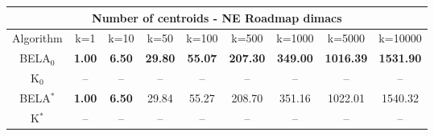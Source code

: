 \begin{tabular}{c|cccccccc}\toprule
\multicolumn{9}{c}{Number of centroids - NE Roadmap dimacs}\\ \midrule
Algorithm & k=1 & k=10 & k=50 & k=100 & k=500 & k=1000 & k=5000 & k=10000 \\ \midrule
BELA$_0$ & \textbf{1.00} & \textbf{6.50} & \textbf{29.80} & \textbf{55.07} & \textbf{207.30} & \textbf{349.00} & \textbf{1016.39} & \textbf{1531.90} \\
K$_0$ & -- & -- & -- & -- & -- & -- & -- & -- \\
BELA$^*$ & \textbf{1.00} & \textbf{6.50} & 29.84 & 55.27 & 208.70 & 351.16 & 1022.01 & 1540.32 \\
K$^*$ & -- & -- & -- & -- & -- & -- & -- & -- \\ \bottomrule 
\end{tabular}
